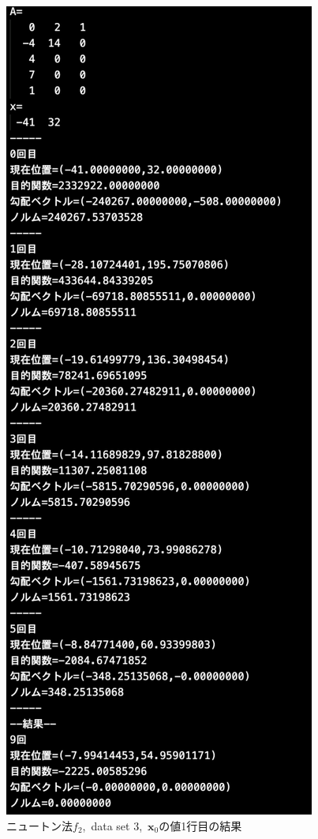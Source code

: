 \documentclass[12pt]{jarticle}
\begin{document}
\clearpage
\begin{figure}[h]
    \begin{center}
        \includegraphics[scale=0.3]{kadai1_2n_out3_1_1.png}
    \end{center}
    \caption{ニュートン法$f_2$,\ data set 3,\ $\boldsymbol{x}_0$の値1行目の結果}
\end{figure}
\end{document}
